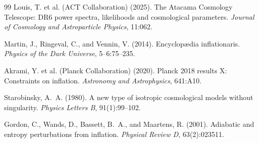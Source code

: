 \documentclass[12pt, a4paper]{article}
\begin{document}
\begin{thebibliography}{99}
Louis, T. et al. (ACT Collaboration) (2025).
The Atacama Cosmology Telescope: DR6 power spectra, likelihoods and cosmological parameters.
\textit{Journal of Cosmology and Astroparticle Physics}, 11:062.

Martin, J., Ringeval, C., and Vennin, V. (2014).
Encyclop{\ae}dia inflationaris.
\textit{Physics of the Dark Universe}, 5--6:75--235.

Akrami, Y. et al. (Planck Collaboration) (2020).
Planck 2018 results X: Constraints on inflation.
\textit{Astronomy and Astrophysics}, 641:A10.

Starobinsky, A.~A. (1980).
A new type of isotropic cosmological models without singularity.
\textit{Physics Letters B}, 91(1):99--102.

Gordon, C., Wands, D., Bassett, B.~A., and Maartens, R. (2001).
Adiabatic and entropy perturbations from inflation.
\textit{Physical Review D}, 63(2):023511.

\end{thebibliography}
\end{document}
